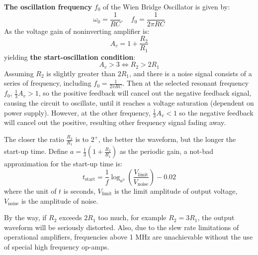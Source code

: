 \documentclass[D:/a_RemoteRepo/GH.LatexNotes/.demo/Analog_Circuits_Handbook.tex]{subfiles}
\begin{document}
\textbf{The oscillation frequency} $f_0$ of the Wien Bridge Oscillator is given by:
\begin{equation}
\omega_0 = \frac{1}{RC},\quad  f_0 = \frac{1}{2 \pi RC}
\end{equation}
As the voltage gain of noninverting amplifier is:
\begin{equation}
A_v = 1 + \frac{R_2}{R_1}
\end{equation}
yielding \textbf{the start-oscillation condition}:
\begin{equation}
    A_v > 3 \Longleftrightarrow  R_2 > 2 R_1
\end{equation}
Assuming $R_2$ is slightly greater than $2R_1$, and there is a noise signal consists of a series of frequency, including $f_0 = \frac{1}{2 \pi RC}$. Then at the selected resonant frequency $f_0$, $\frac{1}{3}A_v > 1$, so the positive feedback will cancel out the negative feedback signal, causing the circuit to oscillate, until it reaches a voltage saturation (dependent on power supply). 
However, at the other frequency, $\frac{1}{3}A_v < 1$ so the negative feedback will cancel out the positive, resulting other frequency signal fading away.

The closer the ratio $\frac{R_2}{R_1}$ is to $2^+$, the better the waveform, but the longer the start-up time. Define $a = \frac{1}{3}\left(1 + \frac{R_2}{R_1}\right)$ as the periodic gain, a not-bad approximation for the start-up time is:
\begin{equation}
t_{\text{start}} = \frac{1}{f} \log_{a^3}\left(\frac{V_\text{limit}}{V_\text{noise}}\right) - 0.02
\end{equation}
where the unit of $t$ is seconds, $V_{\text{limit}}$ is the limit amplitude of output voltage, $V_{\text{noise}}$ is the amplitude of noise.

By the way, if $R_2$ exceeds $2 R_1$ too much, for example $R_2 = 3 R_1$, the output waveform will be seriously distorted. 
Also, due to the slew rate limitations of operational amplifiers, frequencies above 1 MHz are unachievable without the use of special high frequency op-amps.
\end{document}

